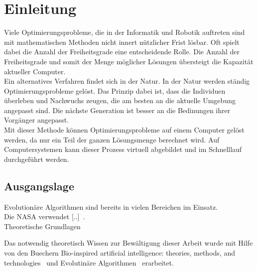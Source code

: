 %
%


\chapter{Einleitung}

  Viele Optimierungsprobleme,
  die in der Informatik und Robotik auftreten sind mit mathematischen Methoden nicht innert nützlicher Frist lösbar.
  Oft spielt dabei die Anzahl der Freiheitsgrade eine entscheidende Rolle.
  Die Anzahl der Freiheitsgrade und somit der Menge möglicher Lösungen übersteigt die Kapazität aktueller Computer.
  \\
  Ein alternatives Verfahren findet sich in der Natur. In der Natur werden ständig Optimierungsprobleme gelöst.
  Das Prinzip dabei ist, dass die Individuen überleben und Nachwuchs zeugen,
  die am besten an die aktuelle Umgebung angepasst sind.
  Die nächste Generation ist besser an die Bedinungen ihrer Vorgänger angepasst. %
  \\
  Mit dieser Methode können Optimierungsprobleme auf einem Computer gelöst werden,
  da nur ein Teil der ganzen Lösungsmenge berechnet wird.
  Auf Computersystemen kann dieser Prozess virtuell abgebildet und im Schnelllauf durchgeführt werden.
  \\

  \section{Ausgangslage}


    Evolutionäre Algorithmen sind bereits in vielen Bereichen im Einsatz.
    \\
    Die NASA verwendet [..]~\cite{Hornby2006}.
    \\
    Theoretische Grundlagen

    Das notwendig theoretisch Wissen zur Bewältigung dieser Arbeit wurde mit Hilfe von den Buechern
    Bio-inspired artificial intelligence: theories, methods, and technologies~\citet{book:bioInspired} und
    Evolutinäre Algorithmen~\citet{book:evAlgo} erarbeitet.


